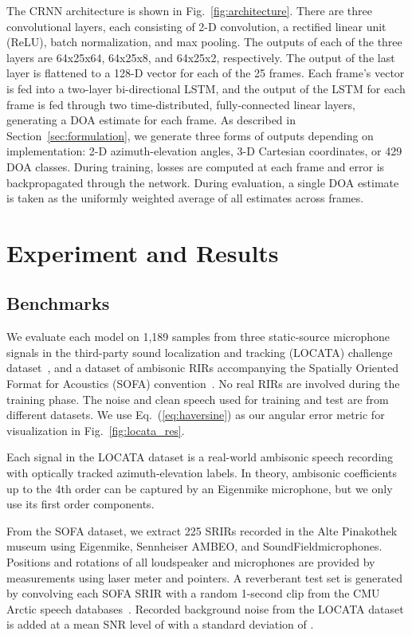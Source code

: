 \documentclass[a4paper]{article}
\begin{document}
The CRNN architecture is shown in Fig.~\ref{fig:architecture}. There are three convolutional layers, each consisting of 2-D convolution, a rectified linear unit (ReLU), batch normalization, and max pooling. The outputs of each of the three layers are 64x25x64, 64x25x8, and 64x25x2, respectively. The output of the last layer is flattened to a 128-D vector for each of the 25 frames. Each frame's vector is fed into a two-layer bi-directional LSTM, and the output of the LSTM for each frame is fed through two time-distributed, fully-connected linear layers, generating a DOA estimate for each frame. As described in Section~\ref{sec:formulation}, we generate three forms of outputs depending on implementation: 2-D azimuth-elevation angles, 3-D Cartesian coordinates, or 429 DOA classes. During training, losses are computed at each frame and error is backpropagated through the network. During evaluation, a single DOA estimate is taken as the uniformly weighted average of all estimates across frames.



 \section{Experiment and Results}
\label{sec:results}
\subsection{Benchmarks}

We evaluate each model on 1,189 samples from three static-source microphone signals in the third-party sound localization and tracking (LOCATA) challenge dataset~\cite{LOCATA2018a}, and a dataset of ambisonic RIRs accompanying the Spatially Oriented Format for Acoustics (SOFA) convention~\cite{perez2018ambisonics}. No real RIRs are involved during the training phase. The noise and clean speech used for training and test are from different datasets. We use Eq.~(\ref{eq:haversine}) as our angular error metric for visualization in Fig.~\ref{fig:locata_res}. 

Each signal in the LOCATA dataset is a real-world ambisonic speech recording with optically tracked azimuth-elevation labels. In theory, ambisonic coefficients up to the 4th order can be captured by an Eigenmike microphone, but we only use its first order components.

From the SOFA dataset, we extract 225 SRIRs recorded in the Alte Pinakothek museum using Eigenmike\textregistered, Sennheiser AMBEO\textregistered, and SoundField\textregistered microphones. Positions and rotations of all loudspeaker and microphones are provided by measurements using laser meter and pointers. A reverberant test set is generated by convolving each SOFA SRIR with a random 1-second clip from the CMU Arctic speech databases~\cite{kominek2004cmu}. Recorded background noise from the LOCATA dataset is added at a mean SNR level of  with a standard deviation of .
\end{document}
